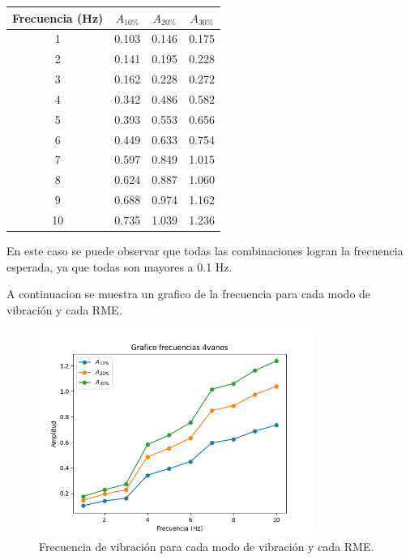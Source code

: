 \begin{table}[H]
    \centering
    \begin{tabular}{cccc}
    \toprule
     Frecuencia (Hz) & $A_{10\%}$ & $A_{20\%}$ & $A_{30\%}$ \\
    \midrule
     1 &       0.103 &       0.146 &       0.175 \\
     2 &       0.141 &       0.195 &       0.228 \\
     3 &       0.162 &       0.228 &       0.272 \\
     4 &       0.342 &       0.486 &       0.582 \\
     5 &       0.393 &       0.553 &       0.656 \\
     6 &       0.449 &       0.633 &       0.754 \\
     7 &       0.597 &       0.849 &       1.015 \\
     8 &       0.624 &       0.887 &       1.060 \\
     9 &       0.688 &       0.974 &       1.162 \\
     10 &       0.735 &       1.039 &       1.236 \\
    \bottomrule
    \end{tabular}
\end{table}

En este caso se puede observar que todas las combinaciones logran la frecuencia esperada, ya que todas son mayores a 0.1 Hz.

A continuacion se muestra un grafico de la frecuencia para cada modo de vibración y cada RME. 

\begin{figure}[H]
    \centering
    \includegraphics[width=0.8\textwidth]{../grafico_frecuencias_4vanos.png}
    \caption{Frecuencia de vibración para cada modo de vibración y cada RME.}
\end{figure}

